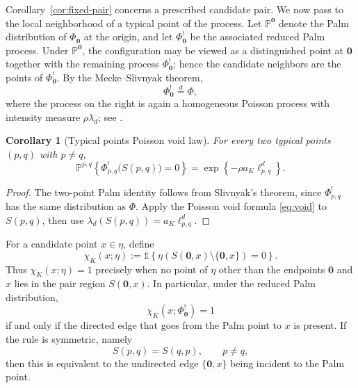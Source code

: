 \documentclass[a4paper,fleqn]{cas-dc}
\numberwithin{equation}{section}
\newcommand{\Pp}{\mathds{P}}
\newcommand{\1}{\mathds{1}}
\newcommand{\ellpq}{\ell_{p,q}}
\newcommand{\0}{\mathbf{0}}
\newtheorem{corollary}[theorem]{Corollary}
\begin{document}
Corollary~\ref{cor:fixed-pair} concerns a prescribed candidate pair. We now pass to the local neighborhood of a typical point of the process. Let $\Pp^{\0}$ denote the Palm distribution of $\Phi_\0$ at the origin, and let $\Phi_{\0}^{!}$ be the associated reduced Palm process. Under $\Pp^{\0}$, the configuration may be viewed as a distinguished point at $\0$ together with the remaining process $\Phi_{\0}^{!}$; hence the candidate neighbors are the points of $\Phi_{\0}^{!}$. By the Mecke--Slivnyak theorem,
\begin{equation}\label{eq:reduced-palm-poisson}
\Phi_{\0}^{!} \overset{d}{=} \Phi,
\end{equation}
where the process on the right is again a homogeneous Poisson process with intensity measure $\rho\lambda_d$; see \citep{baccelli2010stochastic,last2017lectures}.


\begin{corollary}[Typical points Poisson void law]
\label{cor:typical-pair}
For every two typical points \((p,q)\) with \(p\neq q\),
\begin{equation}\label{eq:two-point-palm-acceptance}
\Pp^{p,q}\left\{
\Phi^{!}_{p,q}\bigl(S(p,q)\bigr)=0
\right\}
=
\exp\left\{
-\rho a_K \ellpq^{d}
\right\}.
\end{equation}
\end{corollary}

\begin{proof}
The two-point Palm identity follows
from Slivnyak's theorem, since \(\Phi^{!}_{p,q}\) has the same
distribution as \(\Phi\).
Apply the Poisson void formula \eqref{eq:void} to \(S(p,q)\), then use
\(\lambda_d(S(p,q))=a_K\ellpq^d\). 
\end{proof}

For a candidate point \(x\in\eta\), define
\begin{equation}
\label{eq:palm-edge-indicator}
\chi_K(x;\eta)
:=
\1\!\left\{
\eta\!\left(
S(\0,x)\setminus\{\0,x\}
\right)=0
\right\}.
\end{equation}
Thus \(\chi_K(x;\eta)=1\) precisely when no point of \(\eta\)
other than the endpoints \(\0\) and \(x\) lies in the pair
region \(S(\0,x)\). In particular, under the reduced Palm
distribution,
\begin{equation}
\chi_K(x;\Phi_{\0}^{!})=1
\end{equation}
if and only if the directed edge that goes from the Palm point to \(x\) is present. If the rule is symmetric, namely
\begin{equation}
S(p,q)=S(q,p),
\qquad p\neq q,
\end{equation}
then this is equivalent to the undirected edge
\(\{\0,x\}\) being incident to the Palm point.
\end{document}
